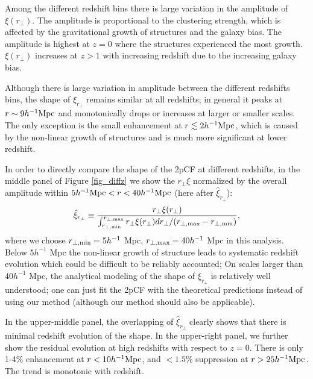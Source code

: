 \documentclass[iop]{emulateapj}
\begin{document}
Among the different redshift bins there is large variation in the amplitude of $\xi(r_\perp)$.
The amplitude is proportional to the clustering strength, which is affected by the gravitational growth of structures and the galaxy bias.
The amplitude is highest at $z=0$ where the structures experienced the most growth.
$\xi(r_\perp)$ increases at $z>1$ with increasing redshift 
due to the increasing galaxy bias.

Although there is large variation in amplitude between the different redshifts bins, 
the shape of $\xi_{r_{\perp}}$  remains similar at all redshifts;
in general it peaks at $r\sim9 h^{-1}\rm Mpc$ and monotonically drops or increases at larger or smaller scales.
The only exception is the small enhancement at $r\lesssim 2 h^{-1}\rm Mpc$,
which is caused by the non-linear growth of structures 
and is much more significant at lower redshift.

In order to directly compare the shape of the 2pCF at different redshifts,
in the middle panel of Figure \ref{fig_diffz} 
we show the $r_\perp\xi$ normalized by the overall amplitude within 
$5h^{-1}{\rm Mpc} < r < 40h^{-1}{\rm Mpc}$
(here after $\hat \xi_{r_\perp}$):
\begin{equation}
 \hat \xi_{ r_\perp} \equiv  \frac{ {r_\perp\xi}(r_{\perp})}{ \int_{r_{\perp, \rm min}}^{r_{\perp, \rm max}}r_{\perp} \xi(r_{\perp}) d r_{\perp} / (r_{\perp,\rm max}-r_{\perp,\rm min}) },
\end{equation}
where we choose $r_{\perp, \rm min}=5 h^{-1}$ Mpc, $r_{\perp, \rm max}=40 h^{-1}$ Mpc in this analysis.
Below $5 h^{-1}$ Mpc the non-linear growth of structure 
leads to systematic redshift evolution which could be difficult to be reliably accounted;
On scales larger than $40 h^{-1}$ Mpc,
the analytical modeling of the shape of $\xi_{r_{\perp}}$ is relatively well understood;
one can just fit the 2pCF with the theoretical predictions \citep{BCGS2001,Salvador2014,Salvador2016} 
instead of using our method 
(although our method should also be applicable).

In the upper-middle panel, the overlapping of $\hat\xi_{r_{\perp}}$
clearly shows that there is minimal redshift evolution of the shape.
In the upper-right panel, 
we further show the residual evolution at high redshifts 
with respect to $z=0$.
There is only 1-4\% enhancement 
at $r<10h^{-1}\rm Mpc$,
and $<1.5\%$ suppression at $r>25 h^{-1}\rm Mpc$.
The trend is monotonic with redshift.
\end{document}
